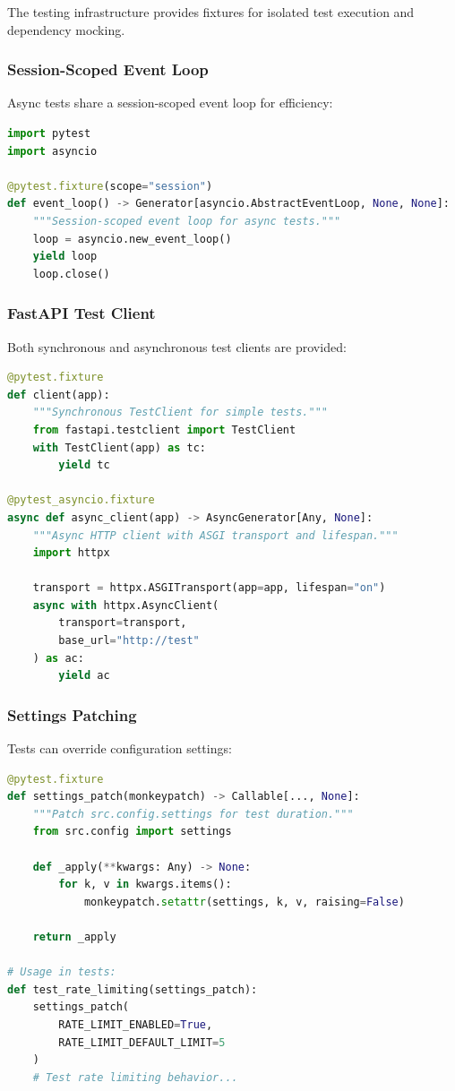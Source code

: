 The testing infrastructure provides fixtures for isolated test execution and dependency mocking.

\subsubsection{Session-Scoped Event Loop}

Async tests share a session-scoped event loop for efficiency:

\begin{lstlisting}[language=Python, caption={Event loop fixture from \texttt{tests/conftest.py}.}]
import pytest
import asyncio

@pytest.fixture(scope="session")
def event_loop() -> Generator[asyncio.AbstractEventLoop, None, None]:
    """Session-scoped event loop for async tests."""
    loop = asyncio.new_event_loop()
    yield loop
    loop.close()
\end{lstlisting}

\subsubsection{FastAPI Test Client}

Both synchronous and asynchronous test clients are provided:

\begin{lstlisting}[language=Python, caption={Test client fixtures.}]
@pytest.fixture
def client(app):
    """Synchronous TestClient for simple tests."""
    from fastapi.testclient import TestClient
    with TestClient(app) as tc:
        yield tc

@pytest_asyncio.fixture
async def async_client(app) -> AsyncGenerator[Any, None]:
    """Async HTTP client with ASGI transport and lifespan."""
    import httpx
    
    transport = httpx.ASGITransport(app=app, lifespan="on")
    async with httpx.AsyncClient(
        transport=transport, 
        base_url="http://test"
    ) as ac:
        yield ac
\end{lstlisting}

\subsubsection{Settings Patching}

Tests can override configuration settings:

\begin{lstlisting}[language=Python, caption={Settings patch fixture.}]
@pytest.fixture
def settings_patch(monkeypatch) -> Callable[..., None]:
    """Patch src.config.settings for test duration."""
    from src.config import settings
    
    def _apply(**kwargs: Any) -> None:
        for k, v in kwargs.items():
            monkeypatch.setattr(settings, k, v, raising=False)
    
    return _apply

# Usage in tests:
def test_rate_limiting(settings_patch):
    settings_patch(
        RATE_LIMIT_ENABLED=True,
        RATE_LIMIT_DEFAULT_LIMIT=5
    )
    # Test rate limiting behavior...
\end{lstlisting}

